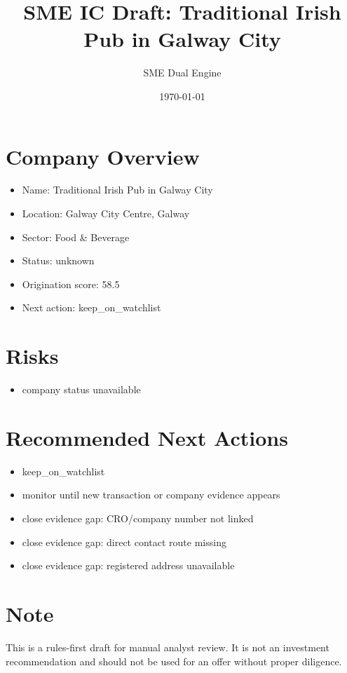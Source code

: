 \documentclass[11pt,a4paper]{article}
\title{SME IC Draft: Traditional Irish Pub in Galway City}
\author{SME Dual Engine}
\date{\today}
\begin{document}
\maketitle
\section*{Company Overview}
\begin{itemize}[leftmargin=1.4em]
\item Name: Traditional Irish Pub in Galway City
\item Location: Galway City Centre, Galway
\item Sector: Food \& Beverage
\item Status: unknown
\item Origination score: 58.5
\item Next action: keep\_on\_watchlist
\end{itemize}
\section*{Risks}
\begin{itemize}[leftmargin=1.4em]
\item company status unavailable
\end{itemize}
\section*{Recommended Next Actions}
\begin{itemize}[leftmargin=1.4em]
\item keep\_on\_watchlist
\item monitor until new transaction or company evidence appears
\item close evidence gap: CRO/company number not linked
\item close evidence gap: direct contact route missing
\item close evidence gap: registered address unavailable
\end{itemize}
\section*{Note}
This is a rules-first draft for manual analyst review. It is not an investment
recommendation and should not be used for an offer without proper diligence.
\end{document}
